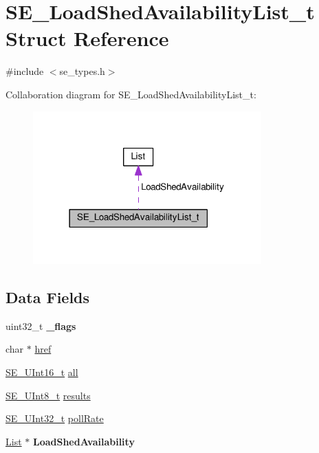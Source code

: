 \hypertarget{structSE__LoadShedAvailabilityList__t}{}\section{S\+E\+\_\+\+Load\+Shed\+Availability\+List\+\_\+t Struct Reference}
\label{structSE__LoadShedAvailabilityList__t}


{\ttfamily \#include $<$se\+\_\+types.\+h$>$}



Collaboration diagram for S\+E\+\_\+\+Load\+Shed\+Availability\+List\+\_\+t\+:\nopagebreak
\begin{figure}[H]
\begin{center}
\leavevmode
\includegraphics[width=249pt]{structSE__LoadShedAvailabilityList__t__coll__graph}
\end{center}
\end{figure}
\subsection*{Data Fields}
\begin{DoxyCompactItemize}
\item 
uint32\+\_\+t {\bfseries \+\_\+flags}
\item 
char $\ast$ \hyperlink{group__LoadShedAvailabilityList_ga759f6f998744203770c7908f3f157784}{href}
\item 
\hyperlink{group__UInt16_gac68d541f189538bfd30cfaa712d20d29}{S\+E\+\_\+\+U\+Int16\+\_\+t} \hyperlink{group__LoadShedAvailabilityList_gaedd3746993d4fb321cdb00aa48c41e92}{all}
\item 
\hyperlink{group__UInt8_gaf7c365a1acfe204e3a67c16ed44572f5}{S\+E\+\_\+\+U\+Int8\+\_\+t} \hyperlink{group__LoadShedAvailabilityList_gab30e5d3f4e29c7b26f294be2f5563a4f}{results}
\item 
\hyperlink{group__UInt32_ga70bd4ecda3c0c85d20779d685a270cdb}{S\+E\+\_\+\+U\+Int32\+\_\+t} \hyperlink{group__LoadShedAvailabilityList_gacd95c2260e71af84870c073faceef2bc}{poll\+Rate}
\item 
\hyperlink{structList}{List} $\ast$ {\bfseries Load\+Shed\+Availability}
\end{DoxyCompactItemize}


